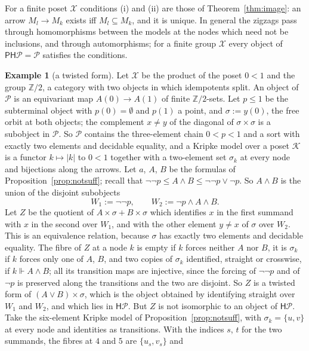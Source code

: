 \documentclass[11pt]{amsart}
\theoremstyle{definition}
\newtheorem{ex}[thm]{Example}
\newcommand{\PP}{\mathsf P}
\newcommand{\HH}{\mathsf H}
\newcommand{\cK}{\mathcal K}
\begin{document}
For a finite poset $\mathcal X$ conditions (i) and (ii) are those of
Theorem~\ref{thm:image}: an arrow $M_l\to M_k$ exists iff
$M_l\subseteq M_k$, and it is unique. In general the zigzags pass through
homomorphisms between the models at the nodes which need not be
inclusions, and through automorphisms; for a finite group $\mathcal X$
every object of $\PP\HH\mathcal P=\mathcal P$ satisfies the conditions.

\begin{ex}[a twisted form]\label{ex:twist}
Let $\mathcal X$ be the product of the poset $0<1$ and the group
$\mathbb Z/2$, a category with two objects in which idempotents split.
An object of $\mathcal P$ is an equivariant map $A(0)\to A(1)$ of
finite $\mathbb Z/2$-sets. Let $p\le1$ be the subterminal object with
$p(0)=\emptyset$ and $p(1)$ a point, and $\sigma:=y(0)$, the free orbit at both objects;
the complement $x\ne y$ of the diagonal of $\sigma\times\sigma$ is a
subobject in $\mathcal P$. So $\mathcal P$ contains the three-element
chain $0<p<1$ and a sort with exactly two elements and decidable
equality, and a Kripke model over a poset $\cK$ is a functor
$k\mapsto|k|$ to $0<1$ together with a two-element set $\sigma_k$ at
every node and bijections along the arrows. Let $a$, $A$, $B$ be the
formulas of Proposition~\ref{prop:notsuff}; recall that $\neg\neg p\le
A\wedge B\le\neg\neg p\vee\neg p$. So $A\wedge B$ is the union of the
disjoint subobjects
\[
W_1:=\neg\neg p,\qquad W_2:=\neg p\wedge A\wedge B.
\]
Let $Z$ be the quotient of $A\times\sigma+B\times\sigma$ which
identifies $x$ in the first summand with $x$ in the second over $W_1$,
and with the other element $y\ne x$ of $\sigma$ over $W_2$. This is an
equivalence relation, because $\sigma$ has exactly two elements and
decidable equality. The fibre of $Z$ at a node $k$ is empty if $k$ forces neither $A$ nor
$B$, it is $\sigma_k$ if $k$
forces only one of $A$, $B$, and two copies of $\sigma_k$ identified,
straight or crosswise, if $k\Vdash A\wedge B$; all its transition maps
are injective, since the forcing of $\neg\neg p$ and of $\neg p$ is
preserved along the transitions and the two are disjoint. So $Z$ is a
twisted form of $(A\vee B)\times\sigma$, which is the object obtained
by identifying straight over $W_1$ and $W_2$, and which lies in
$\HH\mathcal P$. But $Z$ is not isomorphic to an object of
$\HH\mathcal P$. Take the six-element Kripke model of
Proposition~\ref{prop:notsuff}, with $\sigma_k=\{u,v\}$ at every node
and identities as transitions. With the indices $s$, $t$ for the two
summands, the fibres at $4$ and $5$ are $\{u_s,v_s\}$ and

\end{ex}
\end{document}
